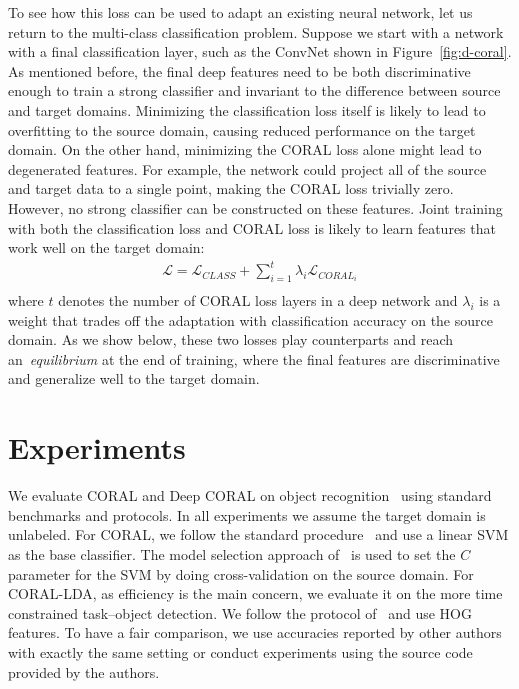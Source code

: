\documentclass[graybox]{svmult}
\begin{document}
To see how this loss can be used to adapt an existing neural network, let us return to the multi-class classification problem. Suppose we start with a network with a final classification layer, such as the ConvNet shown in Figure~\ref{fig:d-coral}.
As mentioned before, the final deep features need to be both discriminative enough to train a strong classifier and invariant to the difference between source and target domains. Minimizing the classification loss itself is likely to lead to overfitting to the source domain, causing reduced performance on the target domain. On the other hand, minimizing the CORAL loss alone might lead to degenerated features. For example, the network could project all of the source and target data to a single point, making the CORAL loss trivially zero. However, no strong classifier can be constructed on these features. Joint training with both the classification loss and CORAL loss is likely to learn features that work well on the target domain:
      \begin{equation}
      \begin{aligned}
      {\mathcal{L}}= {\mathcal{L}_{CLASS}} + \sum_{i=1}^{t}\lambda_{i}{\mathcal{L}_{CORAL_i}}\\
      \end{aligned}
      \label{eq:obj}
      \end{equation}
where $t$ denotes the number of CORAL loss layers in a deep network and $\lambda_i$ is a weight that trades off the adaptation with classification accuracy on the source domain. As we show below, these two losses play counterparts and reach an~\emph{equilibrium} at the end of training, where the final features are discriminative and generalize well to the target domain. \section{Experiments}
\label{sec:exp}



We evaluate CORAL and Deep CORAL on object recognition~\cite{saenko2010adapting} using standard benchmarks and protocols. In all experiments we assume the target domain is unlabeled. For CORAL, we follow the standard procedure~\cite{sa,decaf} and use a linear SVM as the base classifier. The model selection approach of~\cite{sa} is used to set the $C$ parameter for the SVM by doing cross-validation on the source domain. For CORAL-LDA, as efficiency is the main concern, we evaluate it on the more time constrained task--object detection. We follow the protocol of~\cite{ICRA14} and use HOG features. To have a fair comparison, we use accuracies reported by other authors with exactly the same setting or conduct experiments using the source code provided by the authors.
\end{document}
